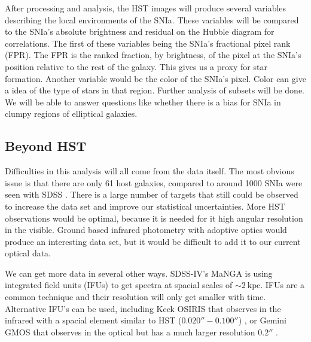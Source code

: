 \documentclass[apj, iop]{emulateapj}
\newcommand{\sn}{SNIa}
\newcommand{\todo}[1]{\textbf{\textcolor{red}{#1}}}
\begin{document}
After processing and analysis, the HST images will produce several variables
describing the local environments of the \sn{}. These variables will be compared
to the \sn{}'s absolute brightness and residual on the Hubble diagram for
correlations. The first of these variables being the \sn{}'s fractional pixel
rank (FPR). The FPR is the ranked fraction, by brightness, of the pixel at the
\sn{}'s position relative to the rest of the galaxy. This gives us a proxy for
star formation. Another variable would be the color of the \sn{}'s pixel. Color
can give a idea of the type of stars in that region. Further analysis of subsets
will be done. We will be able to answer questions like whether there is a bias
for \sn{} in clumpy regions of elliptical galaxies.



\subsection{Beyond HST}\label{beyond-hst}

Difficulties in this analysis will all come from the data itself. The most
obvious issue is that there are only 61 host galaxies, compared to around 1000
\sn{} were seen with SDSS \citep{Campbell13}. There is a large number of targets
that still could be observed to increase the data set and improve our
statistical uncertainties. More HST observations would be optimal, because it is
needed for it high angular resolution in the visible. Ground based infrared
photometry with adoptive optics would produce an interesting data set, but it
would be difficult to add it to our current optical data.

We can get more data in several other ways. SDSS-IV's MaNGA is using integrated
field units (IFUs) to get spectra at spacial scales of $\sim 2 ~\text{kpc}$.
IFUs are a common technique and their resolution will only get smaller with
time. Alternative IFU's can be used, including Keck OSIRIS that observes in the
infrared with a spacial element similar to HST ($0.020'' - 0.100''$)
\citep{OSIRIS},
or Gemini GMOS that observes in the optical but has a much larger resolution
$0.2''$ \citep{Gemini}.
\end{document}
